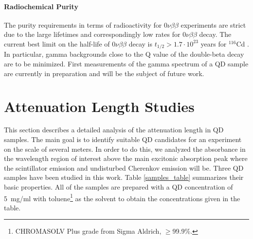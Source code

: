 \documentclass[cits]{JINST}
\begin{document}
\paragraph{Radiochemical Purity}
The purity requirements in terms of radioactivity for 0$\nu\beta\beta$ experiments are strict due to the large lifetimes and correspondingly low rates for 0$\nu\beta\beta$ decay. The current best limit on the half-life of 0$\nu\beta\beta$ decay is $t_{1/2}>1.7\cdot10^{23}$ years for $^{116}$Cd \cite{solotvina}. In particular, gamma backgrounds close to the Q value of the double-beta decay are to be minimized. First measurements of the gamma spectrum of a QD sample are currently in preparation and will be the subject of future work.   

\section{Attenuation Length Studies}\label{Attenuation_length_section}
This section describes a detailed analysis of the attenuation length in QD samples. The main goal is to identify suitable QD candidates for an experiment on the scale of several meters. In order to do this, we analyzed the absorbance in the wavelength region of interest above the main excitonic absorption peak where the scintillator emission and undisturbed Cherenkov emission will be. Three QD samples have been studied in this work. Table \ref{samples_table} summarizes their basic properties. All of the samples are prepared with a QD concentration of 5~mg/ml with toluene\footnote{CHROMASOLV\textsuperscript{\textregistered} Plus grade from Sigma Aldrich, $\geq$99.9\%.} as the solvent to obtain the concentrations given in the table. 
\end{document}
